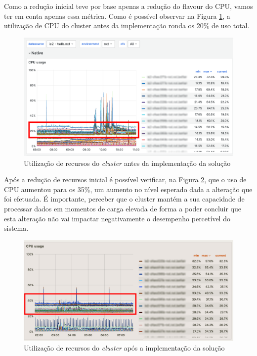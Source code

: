 Como a redução inicial teve por base apenas a redução do \gls{flavour} do \ac{CPU}, vamos ter em
conta apenas essa métrica. Como é possível observar na Figura \ref{usage-before}, a utilização de 
\ac{CPU} do \gls{cluster} antes da implementação ronda os 20\% de uso total.

\begin{figure}[H]
  \centerline{\includegraphics[scale=0.25]{media/content/impl/grafana-before.png}}
  \caption{Utilização de recursos do \textit{cluster} antes da implementação da solução}
  \label{usage-before}
\end{figure}

Após a redução de recursos inicial é possível verificar, na Figura \ref{usage-after}, que o uso 
de CPU aumentou para os 35\%, um aumento no nível esperado dada a alteração que foi efetuada. É 
importante, perceber que o \gls{cluster} mantém a sua capacidade de processar dados em momentos de 
carga elevada de forma a poder concluir que esta alteração não vai impactar negativamente o 
desempenho percetível do sistema. 

\begin{figure}[H]
  \centerline{\includegraphics[scale=0.5]{media/content/impl/grafana-after.png}}
  \caption{Utilização de recursos do \textit{cluster} após a implementação da solução}
  \label{usage-after}
\end{figure}

